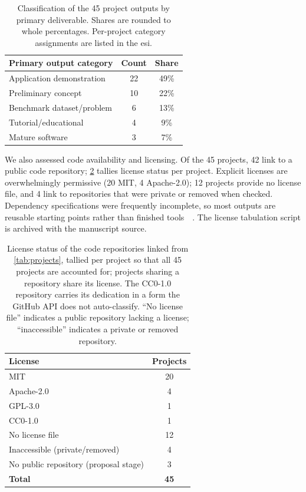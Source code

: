\documentclass[superscriptaddress, nofootinbib,  amsmath, amssymb, twocolumn]{revtex4-2} %
\let\originalcite\cite
\renewcommand{\cite}[1]{\unskip~\originalcite{#1}}
\begin{document}
\begin{table}[tbp]
\centering
\caption{Classification of the 45 project outputs by primary deliverable. Shares are rounded to whole percentages. Per-project category assignments are listed in the \gls{esi}.}
\label{tab:classification}
\begin{tabular}{l c c}
\toprule
\textbf{Primary output category} & \textbf{Count} & \textbf{Share} \\
\midrule
Application demonstration & 22 & 49\% \\
Preliminary concept & 10 & 22\% \\
Benchmark dataset/problem & 6 & 13\% \\
Tutorial/educational & 4 & 9\% \\
Mature software & 3 & 7\% \\
\bottomrule
\end{tabular}
\end{table}

We also assessed code availability and licensing. Of the 45 projects, 42 link to a public code repository; \cref{tab:licenses} tallies license status per project. Explicit licenses are overwhelmingly permissive (20 MIT, 4 Apache-2.0); 12 projects provide no license file, and 4 link to repositories that were private or removed when checked. Dependency specifications were frequently incomplete, so most outputs are reusable starting points rather than finished tools~\cite{nolte_what_2020}. The license tabulation script is archived with the manuscript source.

\begin{table}[tbp]
\centering
\caption{License status of the code repositories linked from \cref{tab:projects}, tallied per project so that all 45 projects are accounted for; projects sharing a repository share its license. The CC0-1.0 repository carries its dedication in a form the GitHub API does not auto-classify. ``No license file'' indicates a public repository lacking a license; ``inaccessible'' indicates a private or removed repository.}
\label{tab:licenses}
\begin{tabular}{l c}
\toprule
\textbf{License} & \textbf{Projects} \\
\midrule
MIT & 20 \\
Apache-2.0 & 4 \\
GPL-3.0 & 1 \\
CC0-1.0 & 1 \\
No license file & 12 \\
Inaccessible (private/removed) & 4 \\
No public repository (proposal stage) & 3 \\
\midrule
\textbf{Total} & \textbf{45} \\
\bottomrule
\end{tabular}
\end{table}
\end{document}
